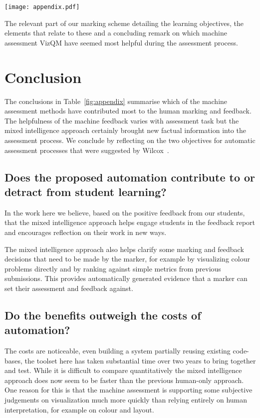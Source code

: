 \begin{table*}[htb]
  \centering
  \texttt{[image: appendix.pdf]}
  \caption{\label{fig:appendix}
           The relevant part of our marking scheme detailing the learning objectives, the elements that relate to these and a concluding remark on which machine assessment VizQM have seemed most helpful during the assessment process.}
\end{table*}

\section{Conclusion}
The conclusions in Table~\ref{fig:appendix} summarise which of the machine assessment methods have contributed most to the human marking and feedback. The helpfulness of the machine feedback varies with assessment task but the mixed intelligence approach certainly brought new factual information into the assessment process. We conclude by reflecting on the two objectives for automatic assessment processes that were suggested by Wilcox~\cite{Wilcox2015}.

\subsection{Does the proposed automation contribute to or detract from student learning?}

In the work here we believe, based on the positive feedback from our students, that the mixed intelligence approach helps engage students in the feedback report and encourages reflection on their work in new ways. 

The mixed intelligence approach also helps clarify some marking and feedback decisions that need to be made by the marker, for example by visualizing colour problems directly and by ranking against simple metrics from previous submissions. This provides automatically generated evidence that a marker can set their assessment and feedback against. 

\subsection{Do the benefits outweigh the costs of automation?}

The costs are noticeable, even building a system partially reusing existing code-bases, the toolset here has taken substantial time over two years to bring together and test. While it is difficult to compare quantitatively the mixed intelligence approach does now seem to be faster than the previous human-only approach. One reason for this is that the machine assessment is supporting some subjective judgements on visualization much more quickly than relying entirely on human interpretation, for example on colour and layout.

